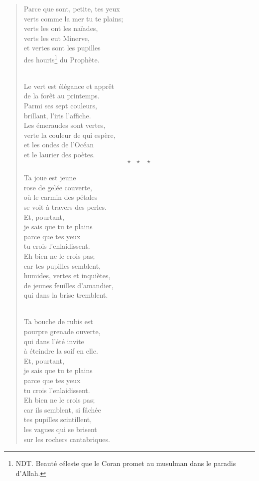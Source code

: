 \documentclass[a4paper,12pt]{book}
\begin{document}
\begin{verse}
Parce que sont, petite, tes yeux \\
verts comme la mer tu te plains; \\
verts les ont les naïades, \\
verts les eut Minerve, \\
et vertes sont les pupilles \\
des houris\footnote{NDT. Beauté céleste que le Coran promet au musulman dans le paradis d'Allah.} du Prophète. \\ \

Le vert est élégance et apprêt \\
de la forêt au printemps. \\
Parmi ses sept couleurs, \\
brillant, l'iris l'affiche. \\
Les émeraudes sont vertes, \\
verte la couleur de qui espère, \\
et les ondes de l'Océan \\
et le laurier des poètes. \\

$$\star \ \ \ \star \ \ \ \star$$ \\

Ta joue est jeune \\
rose de gelée couverte, \\
où le carmin des pétales \\
se voit à travers des perles. \\
Et, pourtant, \\
je sais que tu te plains \\
parce que tes yeux \\
tu crois l'enlaidissent. \\
Eh bien ne le crois pas; \\
car tes pupilles semblent, \\
humides, vertes et inquiètes, \\
de jeunes feuilles d'amandier, \\
qui dans la brise tremblent. \\ \

Ta bouche de rubis est \\
pourpre grenade ouverte, \\
qui dans l'été invite \\
à éteindre la soif en elle. \\
Et, pourtant, \\
je sais que tu te plains \\
parce que tes yeux \\
tu crois l'enlaidissent. \\
Eh bien ne le crois pas; \\
car ils semblent, si fâchée \\
tes pupilles scintillent, \\
les vagues qui se brisent \\
sur les rochers cantabriques. \\


\end{verse}
\end{document}
